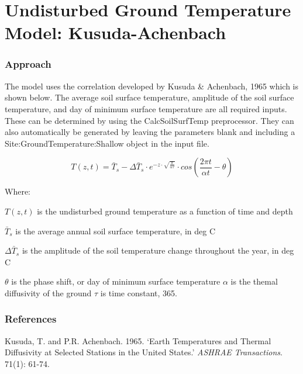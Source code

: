 \section{Undisturbed Ground Temperature Model: Kusuda-Achenbach}\label{undisturbed-ground-temperature-model-kusuda-achenbach}

\subsubsection{Approach}\label{approach-004}

The model uses the correlation developed by Kusuda \& Achenbach, 1965 which is shown below. The average soil surface temperature, amplitude of the soil surface temperature, and day of minimum surface temperature are all required inputs. These can be determined by using the CalcSoilSurfTemp preprocessor. They can also automatically be generated by leaving the parameters blank and including a Site:GroundTemperature:Shallow object in the input file.

\begin{equation}
T(z,t) = \bar{T}_{s} - \Delta\bar{T}_{s} \cdot e^{-z \cdot \sqrt{\frac{\pi}{\alpha\tau}}} \cdot cos\left( \frac{2\pi t}{\alpha t} - \theta \right)
\end{equation}

Where:

\(T(z,t)\) is the undisturbed ground temperature as a function of time and depth

\(\bar{T}_{s}\) is the average annual soil surface temperature, in deg C

\(\Delta\bar{T}_{s}\) is the amplitude of the soil temperature change throughout the year, in deg C

\(\theta\) is the phase shift, or day of minimum surface temperature \(\alpha\) is the themal diffusivity of the ground \(\tau\) is time constant, 365.

\subsubsection{References}\label{references-049}

Kusuda, T. and P.R. Achenbach. 1965. `Earth Temperatures and Thermal Diffusivity at Selected Stations in the United States.' \emph{ASHRAE Transactions}. 71(1): 61-74.
